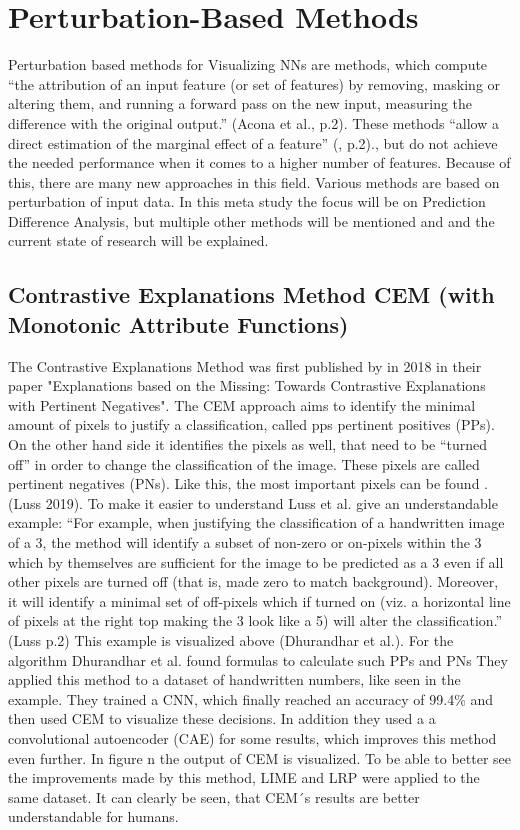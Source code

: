 \section{Perturbation-Based Methods}
Perturbation based methods for Visualizing NNs are methods, which compute “the attribution of an input feature (or set of features) by removing, masking or altering them, and running a forward pass on the new input, measuring the difference with the original output.”  (Acona et al., p.2).
These methods “allow a direct estimation of the marginal effect of a feature” (, p.2)., but do not achieve the needed performance when it comes to a higher number of features.
Because of this, there are many new approaches in this field.
Various methods are based on perturbation of input data. In this meta study the focus will be on Prediction Difference Analysis, but multiple other methods will be mentioned and and the current state of research will be explained.

\subsection{Contrastive Explanations Method CEM (with Monotonic Attribute Functions)}
The Contrastive Explanations Method was first published by  in 2018 in their paper "Explanations based on the Missing: Towards Contrastive Explanations with Pertinent Negatives".
The CEM approach aims to identify the minimal amount of pixels to justify a classification, called \glspl{pp} pertinent positives (PPs). On the other hand side it identifies the pixels as well, that need to be “turned off” in order to change the classification of the image. These pixels are called pertinent negatives (PNs). Like this, the most important pixels can be found .(Luss 2019). To make it easier to understand Luss et al. give an understandable example: “For example, when justifying the classification of a handwritten image of a 3, the method will identify a subset of non-zero or on-pixels within the 3 which by themselves are sufficient for the image to be predicted as a 3 even if all other pixels are turned off (that is, made zero to match background). Moreover, it will identify a minimal set of off-pixels which if turned on (viz. a horizontal line of pixels at the right top making the 3 look like a 5) will alter the classification.” (Luss p.2)
This example is visualized above (Dhurandhar et al.).
For the algorithm Dhurandhar et al. found formulas to calculate such PPs and PNs
They applied this method to a dataset of handwritten numbers, like seen in the example. They trained a CNN, which finally reached an accuracy of 99.4\% and then used CEM to visualize these decisions. In addition they used a a convolutional autoencoder (CAE) for some results, which improves this method even further. In figure n the output of CEM is visualized. To be able to better see the improvements made by this method, LIME and LRP were applied to the same dataset. It can clearly be seen, that CEM´s results are better understandable for humans.

